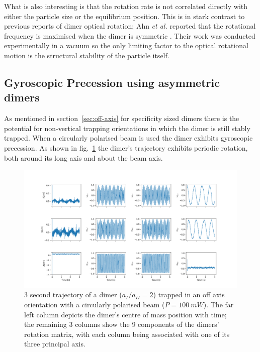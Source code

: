 What is also interesting is that the rotation rate is not correlated 
directly with either the particle size or the equilibrium position. 
This is in stark contrast to previous reports of dimer optical 
rotation; Ahn \textit{et al.} reported that the rotational frequency 
is maximised when the dimer is symmetric \cite{Ahn2018}. Their work 
was conducted experimentally in a vacuum so the only limiting factor 
to the optical rotational motion is the structural stability of the 
particle itself. 

\subsection{Gyroscopic Precession using asymmetric dimers}
As mentioned in section~\ref{sec:off-axis} for specificity sized 
dimers there is the potential for non-vertical trapping orientations 
in which the dimer is still stably trapped. When a circularly 
polarised beam is used the dimer exhibits gyroscopic precession. 
As shown in fig.~\ref{fig:gyro} the dimer's trajectory exhibits 
periodic rotation, both around its long axis and about the beam 
axis.
\begin{figure}[h]
	\centering
	\includegraphics[width=\linewidth]{gyroscopic_precession.png}
	\caption{3 second trajectory of a dimer ($a_{I}/a_{II}=2$) trapped 
		in an off axis orientation with a circularly polarised beam 
		($P= 100\ mW$). The far left column depicts the dimer's centre 
		of mass position with time; the remaining 3 columns show the 9
		components of the dimers' rotation matrix, with each column being
		associated with one of its three principal axis.}
	\label{fig:gyro}
\end{figure}

